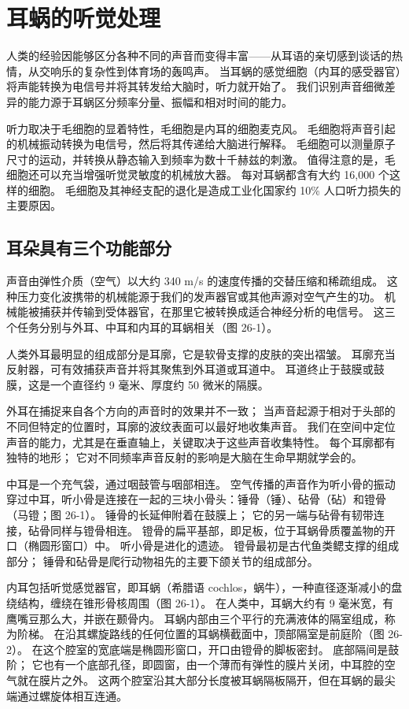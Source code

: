 \chapter{耳蜗的听觉处理}
人类的经验因能够区分各种不同的声音而变得丰富——从耳语的亲切感到谈话的热情，从交响乐的复杂性到体育场的轰鸣声。 当耳蜗的感觉细胞（内耳的感受器官）将声能转换为电信号并将其转发给大脑时，听力就开始了。 我们识别声音细微差异的能力源于耳蜗区分频率分量、振幅和相对时间的能力。

听力取决于毛细胞的显着特性，毛细胞是内耳的细胞麦克风。 毛细胞将声音引起的机械振动转换为电信号，然后将其传递给大脑进行解释。 毛细胞可以测量原子尺寸的运动，并转换从静态输入到频率为数十千赫兹的刺激。 值得注意的是，毛细胞还可以充当增强听觉灵敏度的机械放大器。 每对耳蜗都含有大约 16,000 个这样的细胞。 毛细胞及其神经支配的退化是造成工业化国家约 10\% 人口听力损失的主要原因。



\section{耳朵具有三个功能部分}
声音由弹性介质（空气）以大约 340 m/s 的速度传播的交替压缩和稀疏组成。 这种压力变化波携带的机械能源于我们的发声器官或其他声源对空气产生的功。 机械能被捕获并传输到受体器官，在那里它被转换成适合神经分析的电信号。 这三个任务分别与外耳、中耳和内耳的耳蜗相关（图 26-1）。

人类外耳最明显的组成部分是耳廓，它是软骨支撑的皮肤的突出褶皱。 耳廓充当反射器，可有效捕获声音并将其聚焦到外耳道或耳道中。 耳道终止于鼓膜或鼓膜，这是一个直径约 9 毫米、厚度约 50 微米的隔膜。

外耳在捕捉来自各个方向的声音时的效果并不一致； 当声音起源于相对于头部的不同但特定的位置时，耳廓的波纹表面可以最好地收集声音。 我们在空间中定位声音的能力，尤其是在垂直轴上，关键取决于这些声音收集特性。 每个耳廓都有独特的地形； 它对不同频率声音反射的影响是大脑在生命早期就学会的。

中耳是一个充气袋，通过咽鼓管与咽部相连。 空气传播的声音作为听小骨的振动穿过中耳，听小骨是连接在一起的三块小骨头：锤骨（锤）、砧骨（砧）和镫骨（马镫；图 26-1）。 锤骨的长延伸附着在鼓膜上； 它的另一端与砧骨有韧带连接，砧骨同样与镫骨相连。 镫骨的扁平基部，即足板，位于耳蜗骨质覆盖物的开口（椭圆形窗口）中。 听小骨是进化的遗迹。 镫骨最初是古代鱼类鳃支撑的组成部分； 锤骨和砧骨是爬行动物祖先的主要下颌关节的组成部分。

内耳包括听觉感觉器官，即耳蜗（希腊语 cochlos，蜗牛），一种直径逐渐减小的盘绕结构，缠绕在锥形骨核周围（图 26-1）。 在人类中，耳蜗大约有 9 毫米宽，有鹰嘴豆那么大，并嵌在颞骨内。 耳蜗内部由三个平行的充满液体的隔室组成，称为阶梯。 在沿其螺旋路线的任何位置的耳蜗横截面中，顶部隔室是前庭阶（图 26-2）。 在这个腔室的宽底端是椭圆形窗口，开口由镫骨的脚板密封。 底部隔间是鼓阶； 它也有一个底部孔径，即圆窗，由一个薄而有弹性的膜片关闭，中耳腔的空气就在膜片之外。 这两个腔室沿其大部分长度被耳蜗隔板隔开，但在耳蜗的最尖端通过螺旋体相互连通。

